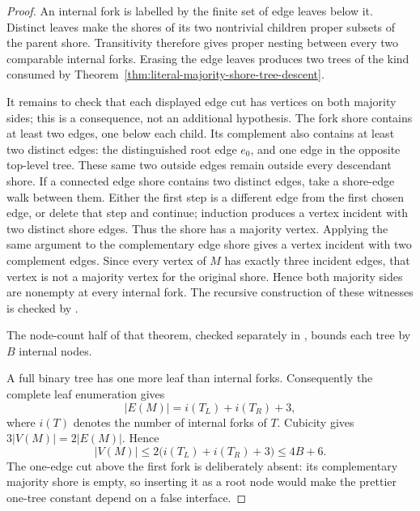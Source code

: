 \begin{proof}
An internal fork is labelled by the finite set of edge leaves below it.  Distinct
leaves make the shores of its two nontrivial children proper subsets of the
parent shore.  Transitivity therefore gives proper nesting between every two
comparable internal forks.  Erasing the edge leaves produces two trees of the
kind consumed by Theorem~\ref{thm:literal-majority-shore-tree-descent}.

It remains to check that each displayed edge cut has vertices on both
majority sides; this is a consequence, not an additional hypothesis.  The
fork shore contains at least two edges, one below each child.  Its complement
also contains at least two distinct edges: the distinguished root edge
\(e_0\), and one edge in the opposite top-level tree.  These same two outside
edges remain outside every descendant shore.  If a connected edge shore
contains two distinct edges, take a shore-edge walk between them.  Either the
first step is a different edge from the first chosen edge, or delete that
step and continue; induction produces a vertex incident with two distinct
shore edges.  Thus the shore has a majority vertex.  Applying the same
argument to the complementary edge shore gives a vertex incident with two
complement edges.  Since every vertex of \(M\) has exactly three incident
edges, that vertex is not a majority vertex for the original shore.  Hence
both majority sides are nonempty at every internal fork.  The recursive
construction of these witnesses is checked by
.

The node-count half of that theorem, checked separately in
,
bounds each tree by \(B\) internal nodes.

A full binary tree has one more leaf than internal forks.  Consequently the
complete leaf enumeration gives
\[
       |E(M)|=i(T_L)+i(T_R)+3,
\]
where \(i(T)\) denotes the number of internal forks of \(T\).
Cubicity gives \(3|V(M)|=2|E(M)|\).  Hence
\[
 |V(M)|\le2\bigl(i(T_L)+i(T_R)+3\bigr)\le4B+6.
\]
The one-edge cut above the first fork is deliberately absent: its
complementary majority shore is empty, so inserting it as a root node would
make the prettier one-tree constant depend on a false interface.
\end{proof}

